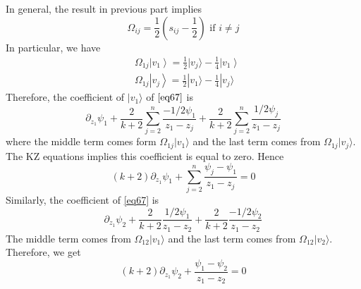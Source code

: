 In general, the result in previous part implies
\[
\Omega_{ij} = \frac{1}{2}(s_{ij} -\frac{1}{2}) \text{ if }  i \neq j
\]
In particular, we have 
\begin{eqnarray}
& \Omega_{1j} \left| v_1 \right\rangle = \frac{1}{2}| v_j\rangle - \frac{1}{4}\left| v_1 \right\rangle \\
& \Omega_{1j} \left| v_j \right\rangle = \frac{1}{2}|v_1 \rangle - \frac{1}{4}|v_j\rangle 
\end{eqnarray}
Therefore, the coefficient of $|v_1 \rangle$  of $\ref{eq67}$ is 
\begin{equation}
	\partial_{z_1 } \psi_1 + \frac{2}{k+2} \sum_{j=2}^n \frac{-1/2 \psi_1}{z_1 -z_j} + \frac{2}{k+2} \sum_{j=2}^n \frac{1/2 \psi_j}{z_1 - z_j}
\end{equation}
where the middle term comes form $\Omega_{1j} |v_1\rangle$ and the last term comes from $\Omega_{1j} |v_j \rangle$. The KZ equations implies this coefficient is equal to zero. Hence
\begin{equation}
	(k+2) \partial_{z_1} \psi_1 + \sum_{j=2}^n \frac{\psi_j - \psi_1}{z_1 - z_j} =0 
\end{equation}
Similarly, the coefficient of \ref{eq67} is 
\begin{equation}
	\partial_{z_1} \psi_2 + \frac{2}{k+2} \frac{1/2 \psi_1}{z_1 - z_2} + \frac{2}{k+2} \frac{-1/2 \psi_2}{z_1 - z_2}
\end{equation}
The middle term comes from $\Omega_{12} | v_1 \rangle$ and the last term comes from $\Omega_{12} | v_2 \rangle$. Therefore, we get
\begin{equation}
(k+2) \partial_{z_1} \psi_2 + \frac{\psi_1 - \psi_2}{z_1 - z_2} =0
\end{equation}